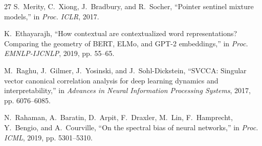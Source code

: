 \documentclass[conference]{IEEEtran}
\begin{document}
\begin{thebibliography}{27}
S.~Merity, C.~Xiong, J.~Bradbury, and R.~Socher, ``Pointer sentinel
mixture models,'' in \emph{Proc. ICLR}, 2017.

K.~Ethayarajh, ``How contextual are contextualized word representations?
Comparing the geometry of BERT, ELMo, and GPT-2 embeddings,'' in
\emph{Proc. EMNLP-IJCNLP}, 2019, pp. 55--65.

M.~Raghu, J.~Gilmer, J.~Yosinski, and J.~Sohl-Dickstein, ``SVCCA:
Singular vector canonical correlation analysis for deep learning
dynamics and interpretability,'' in \emph{Advances in Neural Information
Processing Systems}, 2017, pp. 6076--6085.

N.~Rahaman, A.~Baratin, D.~Arpit, F.~Draxler, M.~Lin, F.~Hamprecht,
Y.~Bengio, and A.~Courville, ``On the spectral bias of neural
networks,'' in \emph{Proc. ICML}, 2019, pp. 5301--5310.

\end{thebibliography}
\end{document}
